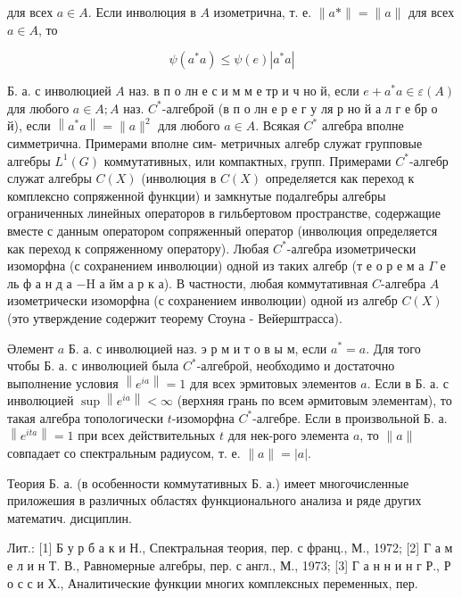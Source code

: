 \documentclass[10pt]{article}
\begin{document}
для всех $a \in A$. Если инволюция в $A$ изометрична, т. е. $\|a *\|=\|a\|$ для всех $a \in A$, то



\[

\psi\left(a^{*} a\right) \leqslant \psi(e)\left|a^{*} a\right|

\]



Б. а. с инволюцией $A$ наз. в п о лн е с и м м е тр и ч но й, если $e+a^{*} a \in \varepsilon(A)$ для любого $a \in A ; A$ наз. $C^{*}$-алгеброй (в п о лн е р е г у ля р но й а л г е бр о й), если $\left\|a^{*} a\right\|=\|a\|^{2}$ для любого $a \in A$. Всякая $C^{*}$ алгебра вполне симметрична. Примерами вполне сим- метричных алгебр служат групповые алгебры $L^{1}(G)$ коммутативных, или компактных, групп. Примерами $C^{*}$-алгебр служат алгебры $C(X)$ (инволюция в $C(X)$ определяется как переход к комплексно сопряженной функции) и замкнутые подалгебры алгебры ограниченных линейных операторов в гильбертовом пространстве, содержащие вместе с данным оператором сопряженный оператор (инволюция определяется как переход к сопряженному оператору). Любая $C^{*}$-алгебра изометрически изоморфна (с сохранением инволюции) одной из таких алгебр (т е о р е м а $\Gamma$ е ль ф а н д а $-\mathrm{H}$ а йм а р к а). В частности, любая коммутативная $C$-алгебра $A$ изометрически изоморфна (с сохранением инволюции) одной из алгебр $C(X)$ (это утверждение содержит теорему Стоуна - Вейерштрасса).



Әлемент $a$ Б. а. с инволюцией наз. э р м и т о в ы м, если $a^{*}=a$. Для того чтобы Б. а. с инволюцией была $C^{*}$-алгеброй, необходимо и достаточно выполнение условия $\left\|e^{i a}\right\|=1$ для всех эрмитовых элементов $a$. Если в Б. а. с инволюцией $\sup \left\|e^{i a}\right\|<\infty$ (верхняя грань по всем әрмитовым элементам), то такая алгебра топологически $t$-изоморфна $C^{*}$-алгебре. Если в произвольной Б. а. $\left\|e^{i t a}\right\|=1$ при всех действительных $t$ для нек-рого элемента $a$, то $\|a\|$ совпадает со спектральным радиусом, т. е. $\|a\|=|a|$.



Теория Б. а. (в особенности коммутативных Б. а.) имеет многочисленные приложешия в различных областях функционального анализа и ряде других математич. дисциплин.



Лит.: [1] Б у р б а к и Н., Спектральная теория, пер. с франц., М., 1972; [2] Г а м е л и н Т. В., Равномерные алгебры, пер. с англ., М., 1973; [3] Г а н н и н г Р., Р о с с и Х., Аналитические функции многих комплексных переменных, пер.
\end{document}
